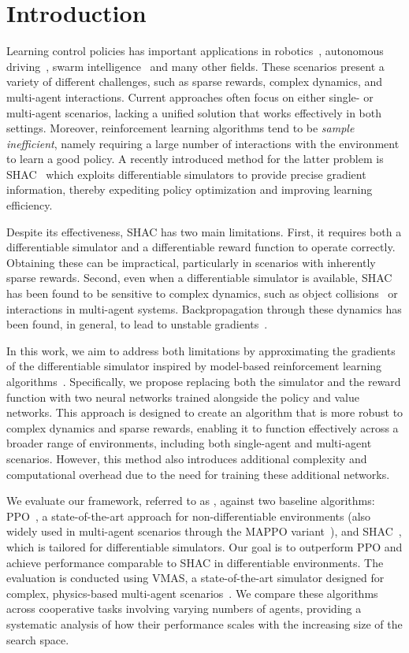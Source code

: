 \section{Introduction}\label{sect:introduction}
Learning control policies has important applications in robotics~\cite{Singh22}, autonomous driving~\cite{Elallid22}, swarm intelligence~\cite{Tang21} and many other fields. These scenarios present a variety of different challenges, such as sparse rewards, complex dynamics, and multi-agent interactions. Current approaches often focus on either single- or multi-agent scenarios, lacking a unified solution that works effectively in both settings. Moreover, reinforcement learning algorithms tend to be \emph{sample inefficient}, namely requiring a large number of interactions with the environment to learn a good policy.
A recently introduced method for the latter problem is SHAC~\cite{Xu22} which exploits differentiable simulators to provide precise gradient information, thereby expediting policy optimization and improving learning efficiency.

Despite its effectiveness, SHAC has two main limitations. First, it requires both a differentiable simulator and a differentiable reward function to operate correctly. Obtaining these can be impractical, particularly in scenarios with inherently sparse rewards. Second, even when a differentiable simulator is available, SHAC has been found to be sensitive to complex dynamics, such as object collisions~\cite{Georgiev24} or interactions in multi-agent systems. Backpropagation through these dynamics has been found, in general, to lead to unstable gradients~\cite{Bengio94,Metz21}.

In this work, we aim to address both limitations by approximating the gradients of the differentiable simulator inspired by model-based reinforcement learning algorithms~\cite{DBLP:conf/icml/HafnerLFVHLD19,DBLP:conf/iclr/HafnerLB020}.
Specifically, we propose replacing both the simulator and the reward function with two neural networks trained alongside the policy and value networks. This approach is designed to create an algorithm that is more robust to complex dynamics and sparse rewards, enabling it to function effectively across a broader range of environments, including both single-agent and multi-agent scenarios. However, this method also introduces additional complexity and computational overhead due to the need for training these additional networks.

We evaluate our framework, referred to as \fname{}, against two baseline algorithms: PPO~\cite{Schulman17}, a state-of-the-art approach for non-differentiable environments (also widely used in multi-agent scenarios through the MAPPO variant~\cite{DBLP:conf/nips/YuVVGWBW22}), and SHAC~\cite{Xu22}, which is tailored for differentiable simulators. Our goal is to outperform PPO and achieve performance comparable to SHAC in differentiable environments. The evaluation is conducted using VMAS, a state-of-the-art simulator designed for complex, physics-based multi-agent scenarios~\cite{DBLP:conf/dars/BettiniKBP22}. We compare these algorithms across cooperative tasks involving varying numbers of agents, providing a systematic analysis of how their performance scales with the increasing size of the search space.

